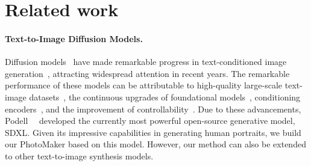 \section{Related work}
\paragraph{Text-to-Image Diffusion Models.}
Diffusion models~\cite{ho2020denoising, song2020denoising} have made remarkable progress in text-conditioned image generation~\cite{ saharia2022photorealistic, rombach2022high, kawar2022imagic, ramesh2022hierarchical}, attracting widespread attention in recent years.
The remarkable performance of these models can be attributable to  high-quality large-scale text-image datasets~\cite{changpinyo2021conceptual,schuhmann2021laion,schuhmann2022laion}, the continuous upgrades of foundational models~\cite{chen2023pixart, peebles2023scalable}, conditioning 
encoders~\cite{radford2021learning,ilharco_gabriel_2021_5143773, raffel2020exploring}, and the improvement of controllability~\cite{li2023gligen, zhang2023adding, mou2023t2i, ye2023ip}. 
Due to these advancements,  Podell~\etal~\cite{podell2023sdxl} developed the currently most powerful open-source generative model, SDXL.
Given its impressive capabilities in generating human portraits, we build our PhotoMaker based on this model. 
However, our method can also be extended to other text-to-image synthesis models.




